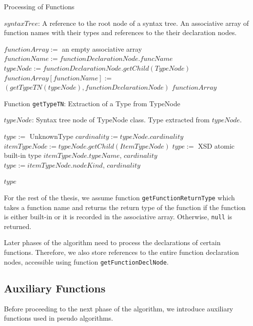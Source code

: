 \begin{algorithm}
\caption{Processing of Functions}
\label{ALG_processing_of_functions}
\begin{algorithmic}[1]
\REQUIRE $syntaxTree$: A reference to the root node of a syntax tree.
\ENSURE An associative array of function names with their types and references to the their declaration nodes.

\STATE $functionArray :=$ an empty associative array
    \STATE $functionName := functionDeclarationNode.funcName$
    \STATE $typeNode := functionDeclarationNode.getChild(TypeNode)$
    \STATE $functionArray[functionName] :=$ \\ $(getTypeTN(typeNode), functionDeclarationNode)$
\ENDFOR
\RETURN $functionArray$
\end{algorithmic}
\end{algorithm}

\begin{algorithm}
\caption{Function \texttt{getTypeTN}: Extraction of a Type from TypeNode}
\label{ALG_extraction_of_a_type_from_typenode}
\begin{algorithmic}[1]
\REQUIRE $typeNode$: Syntax tree node of TypeNode class.
\ENSURE Type extracted from $typeNode$.

\STATE $type :=$ UnknownType
\STATE $cardinality := typeNode.cardinality$
\STATE $itemTypeNode := typeNode.getChild(ItemTypeNode)$
    \STATE $type :=$ XSD atomic built-in type $itemTypeNode.typeName$, $cardinality$
    \STATE $type := itemTypeNode.nodeKind$, $cardinality$
\ENDIF

\RETURN $type$
\end{algorithmic}
\end{algorithm}

For the rest of the thesis, we assume function \texttt{getFunctionReturnType} which takes a function name and returns the return type of the function if the function is either built-in or it is recorded in the associative array. Otherwise, \texttt{null} is returned.

Later phases of the algorithm need to process the declarations of certain functions. Therefore, we also store references to the entire function declaration nodes, accessible using function \texttt{getFunctionDeclNode}.

\subsection{Auxiliary Functions}
Before proceeding to the next phase of the algorithm, we introduce auxiliary functions used in pseudo algorithms.

